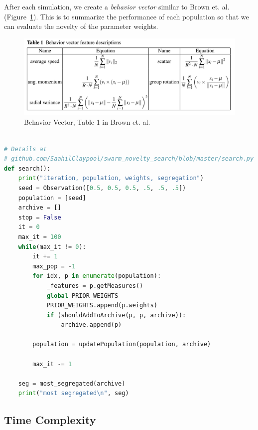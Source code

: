 After each simulation, we create a \emph{behavior vector} similar to Brown et. al. (Figure~\ref{fig:vec}).
This is to summarize the performance of each population so that we can evaluate the novelty of the parameter weights. 

\begin{figure}
    \centering
    \includegraphics[width=\linewidth]{imgs/measures.png}
    \caption{Behavior Vector, Table 1 in Brown et. al.\cite{c1}}
    \label{fig:vec}
\end{figure}

\begin{lstlisting}[caption={Search algorithm (Python)}, label={lst:search}, language=Python, breaklines=true]

# Details at 
# github.com/SaahilClaypool/swarm_novelty_search/blob/master/search.py
def search():
    print("iteration, population, weights, segregation")
    seed = Observation([0.5, 0.5, 0.5, .5, .5, .5])
    population = [seed]
    archive = []
    stop = False
    it = 0
    max_it = 100
    while(max_it != 0):
        it += 1
        max_pop = -1
        for idx, p in enumerate(population):
            _features = p.getMeasures()
            global PRIOR_WEIGHTS
            PRIOR_WEIGHTS.append(p.weights)
            if (shouldAddToArchive(p, p, archive)):
                archive.append(p)

        population = updatePopulation(population, archive)

        max_it -= 1

    seg = most_segregated(archive)
    print("most segregated\n", seg)

\end{lstlisting}

\subsection{Time Complexity}
\label{sec:time}


